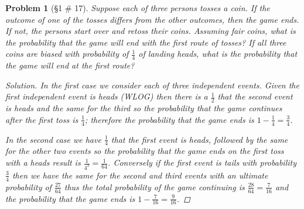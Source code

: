 \documentclass[11pt, oneside]{book}   	%
\newtheorem{problem}{Problem}
\begin{document}
\begin{problem}[\S 1 \# 17]
	Suppose each of three persons tosses a coin. If the outcome of one of the tosses differs from the other outcomes, then the game ends. If not, the persons start over and retoss their coins. Assuming fair coins, what is the probability that the game will end with the first route of tosses? If all three coins are biased with probability of $\frac{1}{4}$ of landing heads, what is the probability that the game will end at the first route? 
	\begin{proof}[Solution]
		In the first case we consider each of three independent events. Given the first independent event is heads (WLOG) then there is a $\frac{1}{2}$ that the second event is heads and the same for the third so the probability that the game continues after the first toss is $\frac{1}{4}$; therefore the probability that the game ends is $1-\frac{1}{4}=\frac{3}{4}$. 
		
		In the second case we have $\frac{1}{4}$ that the first event is heads, followed by the same for the other two events so the probability that the game ends on the first toss with a heads result is $\frac{1}{4^3}=\frac{1}{64}$. Conversely if the first event is tails with probability $\frac{3}{4}$ then we have the same for the second and third events with an ultimate probability of $\frac{27}{64}$ thus the total probability of the game continuing is $\frac{28}{64}=\frac{7}{16}$ and the probability that the game ends is $1-\frac{7}{16}=\frac{9}{16}$. 
	\end{proof}
\end{problem}
\end{document}
